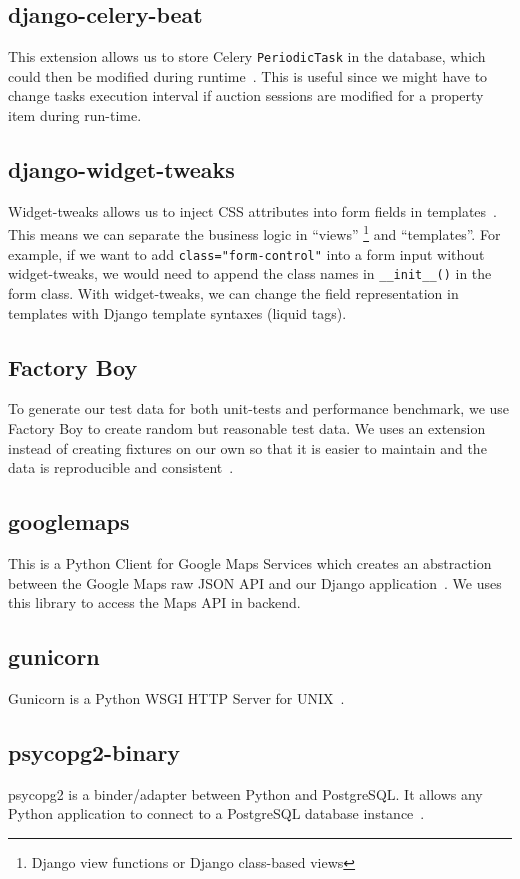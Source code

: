 \subsection{django-celery-beat}\label{sec:dep-celery-beat}
This extension allows us to store Celery \texttt{PeriodicTask} in the database,
which could then be modified during
runtime~\cite{django-celery-beat-doc}. This is useful since we
might have to change tasks execution interval if auction sessions are modified
for a property item during run-time.

\subsection{django-widget-tweaks}
Widget-tweaks allows us to inject CSS attributes into form fields in
templates~\cite{widget-tweaks}. This means we can separate the business logic
in ``views'' \footnote{Django view functions or Django class-based views} and
``templates''. For example, if we want to add \texttt{class="form-control"}
into a form input without widget-tweaks, we would need to append the class names
in \texttt{\_\_init\_\_()} in the form class. With widget-tweaks, we can change the
field representation in templates with Django template syntaxes (liquid tags).

\subsection{Factory Boy}
To generate our test data for both unit-tests and performance benchmark, we use
Factory Boy to create random but reasonable test data. We uses an extension
instead of creating fixtures on our own so that it is easier to maintain and the
data is reproducible and consistent~\cite{factory-boy-doc}.

\subsection{googlemaps}
This is a Python Client for Google Maps Services which creates an abstraction
between the Google Maps raw JSON API and our Django
application~\cite{python-google-maps}. We uses this library to access the Maps
API in backend.

\subsection{gunicorn}
Gunicorn is a Python WSGI HTTP Server for UNIX~\cite{gunicorn}.

\subsection{psycopg2-binary}
psycopg2 is a binder/adapter between Python and PostgreSQL\@. It allows any Python
application to connect to a PostgreSQL database instance~\cite{psycopg2}.

